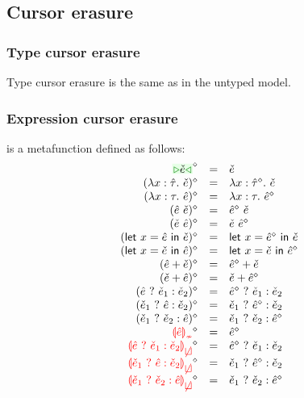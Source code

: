 \documentclass[formalism.tex]{subfiles}
\begin{document}
\subsection{Cursor erasure}
\subsubsection{Type cursor erasure}
Type cursor erasure is the same as in the untyped model.

\subsubsection{Expression cursor erasure}
\judgbox{\ensuremath{\cursorErase{\ZMV}}} is a metafunction defined as follows:
%
\newcommand{\cursorErasesToRow}[2]{\ensuremath{\cursorErase{#1} & = & #2}}
\[\begin{array}{rcl}
  \cursorErasesToRow{\ZCursor{\ECMV}}{\ECMV} \\
  \cursorErasesToRow{(\ZLamT{x}{\ZTMV}{\ECMV})}{\ECLam{x}{\cursorErase{\ZTMV}}{\ECMV}} \\
  \cursorErasesToRow{(\ZLamE{x}{\TMV}{\ZMV})}{\ECLam{x}{\TMV}{\cursorErase{\ZMV}}} \\
  \cursorErasesToRow{(\ZApL{\ZMV}{\ECMV})}{\ECAp{\cursorErase{\ZMV}}{\ECMV}} \\
  \cursorErasesToRow{(\ZApR{\ECMV}{\ZMV})}{\ECAp{\ECMV}{\cursorErase{\ZMV}}} \\
  \cursorErasesToRow{(\ZLetL{x}{\ZMV}{\ECMV})}{\ECLet{x}{\cursorErase{\ZMV}}{\ECMV}} \\
  \cursorErasesToRow{(\ZLetR{x}{\ECMV}{\ZMV})}{\ECLet{x}{\ECMV}{\cursorErase{\ZMV}}} \\
  \cursorErasesToRow{(\ZPlusL{\ZMV}{\ECMV})}{\ECPlus{\cursorErase{\ZMV}}{\ECMV}} \\
  \cursorErasesToRow{(\ZPlusR{\ECMV}{\ZMV})}{\ECPlus{\ECMV}{\cursorErase{\ZMV}}} \\
  \cursorErasesToRow{(\ZIfC{\ZMV}{\ECMV_1}{\ECMV_2})}{\ECIf{\cursorErase{\ZMV}}{\ECMV_1}{\ECMV_2}} \\
  \cursorErasesToRow{(\ZIfL{\ECMV_1}{\ZMV}{\ECMV_2})}{\ECIf{\ECMV_1}{\cursorErase{\ZMV}}{\ECMV_2}} \\
  \cursorErasesToRow{(\ZIfL{\ECMV_1}{\ECMV_2}{\ZMV})}{\ECIf{\ECMV_1}{\ECMV_2}{\cursorErase{\ZMV}}} \\
  \cursorErasesToRow{\ZInconType{\ZMV}}{\cursorErase{\ZMV}} \\
  \cursorErasesToRow{\ZInconBrC{\ZMV}{\ECMV_1}{\ECMV_2}}{\ECIf{\cursorErase{\ZMV}}{\ECMV_1}{\ECMV_2}} \\
  \cursorErasesToRow{\ZInconBrL{\ECMV_1}{\ZMV}{\ECMV_2}}{\ECIf{\ECMV_1}{\cursorErase{\ZMV}}{\ECMV_2}} \\
  \cursorErasesToRow{\ZInconBrR{\ECMV_1}{\ECMV_2}{\ZMV}}{\ECIf{\ECMV_1}{\ECMV_2}{\cursorErase{\ZMV}}} \\
\end{array}\]
\end{document}
